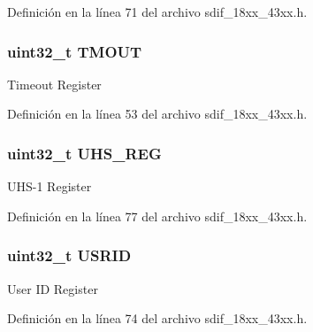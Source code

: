 Definición en la línea 71 del archivo sdif\+\_\+18xx\+\_\+43xx.\+h.

\subsubsection[{\texorpdfstring{T\+M\+O\+UT}{TMOUT}}]{ uint32\+\_\+t T\+M\+O\+UT}\hypertarget{struct_l_p_c___s_d_m_m_c___t_a84a02a884f64aec38f149cefa595b7bf}{}\label{struct_l_p_c___s_d_m_m_c___t_a84a02a884f64aec38f149cefa595b7bf}
Timeout Register 

Definición en la línea 53 del archivo sdif\+\_\+18xx\+\_\+43xx.\+h.

\subsubsection[{\texorpdfstring{U\+H\+S\+\_\+\+R\+EG}{UHS_REG}}]{ uint32\+\_\+t U\+H\+S\+\_\+\+R\+EG}\hypertarget{struct_l_p_c___s_d_m_m_c___t_a5ba2a6f1855137ebcbf6348be9cd289f}{}\label{struct_l_p_c___s_d_m_m_c___t_a5ba2a6f1855137ebcbf6348be9cd289f}
U\+H\+S-\/1 Register 

Definición en la línea 77 del archivo sdif\+\_\+18xx\+\_\+43xx.\+h.

\subsubsection[{\texorpdfstring{U\+S\+R\+ID}{USRID}}]{ uint32\+\_\+t U\+S\+R\+ID}\hypertarget{struct_l_p_c___s_d_m_m_c___t_a48d0a33b2e3534dd78fdb82d2f202c65}{}\label{struct_l_p_c___s_d_m_m_c___t_a48d0a33b2e3534dd78fdb82d2f202c65}
User ID Register 

Definición en la línea 74 del archivo sdif\+\_\+18xx\+\_\+43xx.\+h.

